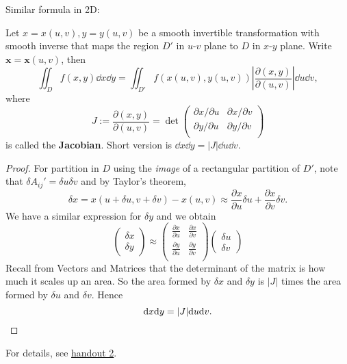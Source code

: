 Similar formula in 2D:
\begin{proposition}
    Let $ x=x(u,v),y=y(u,v) $ be a smooth invertible transformation with smooth inverse that maps the region $D'$ in $u$-$v$ plane to $D$ in $x$-$y$ plane. Write $ \mathbf{x}=\mathbf{x}(u,v) $, then 
    \[
        \iint_{D}f(x,y)\dd x\dd y = \iint_{D'} f(x(u,v),y(u,v)) \left| \frac{\partial (x,y)}{\partial (u,v)}  \right| \dd u\dd v,
    \]
    where 
    \[
        J:=\frac{\partial (x,y)}{\partial (u,v)} = \det \begin{pmatrix}
            \partial x/\partial u  & \partial x/\partial v  \\
            \partial y/\partial u  & \partial y/\partial v  \\
        \end{pmatrix}
    \]
    is called the \textbf{Jacobian}. Short version is $ \dd x\dd y = |J| \dd u\dd v. $
\end{proposition}

\begin{proof}
    For partition in $D$ using the \textit{image} of a rectangular partition of $D'$, note that $ \delta A_{ij}'=\delta u \delta v $ and by Taylor's theorem,
    \[
        \delta x = x(u + \delta u, v + \delta v) - x(u, v) \approx \frac{\partial x}{\partial u}\delta u + \frac{\partial x}{\partial v}\delta v.
    \]
    We have a similar expression for $\delta y$ and we obtain
    \[
        \begin{pmatrix}
        \delta x\\
        \delta y
        \end{pmatrix}
        \approx
        \begin{pmatrix}
        \frac{\partial x}{\partial u} & \frac{\partial x}{\partial v}\\
        \frac{\partial y}{\partial u} & \frac{\partial y}{\partial v}\\
        \end{pmatrix}
        \begin{pmatrix}
        \delta u\\
        \delta v
        \end{pmatrix}
    \]
    Recall from Vectors and Matrices that the determinant of the matrix is how much it scales up an area. So the area formed by $\delta x$ and $\delta y$ is $|J|$ times the area formed by $\delta u$ and $\delta v$. Hence
    \[
        \mathrm{d} x\dd y = |J| \dd u\dd v.\qedhere
    \]
\end{proof}
For details, see \href{http://jt775.user.srcf.net/IA-Lent/handouts/vc_handout2.pdf}{handout 2}.

